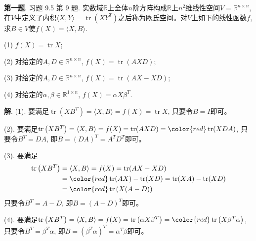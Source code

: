 \usepackage{relsize}

\renewcommand{\newpageorvspace}{\vspace{2em}}

\date{2022-6-17  第七次习题课}




\maketitle




{\bf 第一题}. 习题 9.5 第 9 题. 实数域$\mathbb{R}$上全体$n$阶方阵构成$\mathbb{R}$上$n^2$维线性空间$V = \mathbb{R}^{n\times n}$, 在$V$中定义了内积$\langle X, Y \rangle = \operatorname{tr} \left( XY^T \right)$之后称为欧氏空间。对$V$上如下的线性函数$f$, 求$B\in V$使$f(X) = \langle X, B \rangle.$

(1) $f(X) = \operatorname{tr} X$;

(2) 对给定的$A, D \in \mathbb{R}^{n\times n}$, $f(X) = \operatorname{tr}(AXD)$;

(3) 对给定的$A, D \in \mathbb{R}^{n\times n}$, $f(X) = \operatorname{tr}(AX - XD)$;

(4) 对给定的$\alpha, \beta \in \mathbb{R}^{1\times n}$, $f(X) = \alpha X \beta^T$.

\newpageorvspace

{\bf 解}. (1). 要满足$\operatorname{tr} \left( XB^T \right) = \langle X, B \rangle = f(X) = \operatorname{tr} X$, 只要令$B = I$即可。

(2). 要满足$\operatorname{tr} \left( XB^T \right) = \langle X, B \rangle = f(X) = \operatorname{tr} (AXD) = {\color{red} \operatorname{tr} (XDA)}$, 只要令$B^T = DA$, 即$B = (DA)^T = A^T D^T$即可。

(3). 要满足
\begin{align*}
\operatorname{tr} \left( XB^T \right) & = \langle X, B \rangle = f(X) = \operatorname{tr} (AX - XD) \\
& = {\color{red} \operatorname{tr} (AX) - \operatorname{tr} (XD) = \operatorname{tr} (XA) - \operatorname{tr} (XD)} \\
& = {\color{red} \operatorname{tr} \left( X(A-D) \right)}
\end{align*}
只要令$B^T = A-D$, 即$B = (A-D)^T$即可。

(4). 要满足$\operatorname{tr} \left( XB^T \right) = \langle X, B \rangle = f(X) = \operatorname{tr} \left( \alpha X \beta^T \right) = {\color{red} \operatorname{tr} \left( X \beta^T \alpha \right)}$, 只要令$B^T = \beta^T \alpha$, 即$B = (\beta^T \alpha)^T = \alpha^T \beta$即可。

